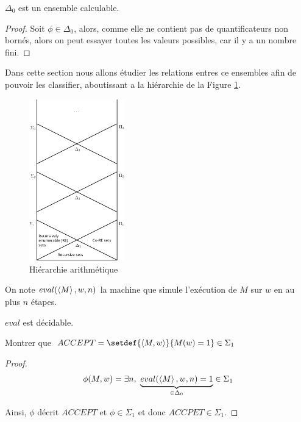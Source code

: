 \begin{prop}
	$\Delta_0$ est un ensemble calculable.
\end{prop}

\begin{proof}
	Soit $\phi \in \Delta_0$, alors, comme elle ne contient pas de quantificateurs non bornés, alors on peut essayer toutes les valeurs possibles, car il y a un nombre
	fini.
\end{proof}


Dans cette section nous allons étudier les relations entres ce ensembles afin de pouvoir les classifier, aboutissant a la hiérarchie de la Figure \ref{fig:arith-hier}.


\begin{figure}[h]
	\begin{center}
		\includegraphics[height=7cm]{./images/Arithmetic_hierarchy.png}
	\end{center}
	\caption{Hiérarchie arithmétique}
	\label{fig:arith-hier}
\end{figure}



\begin{definition}[eval]
	On note $eval(\left\langle M\right\rangle, w, n)$ la machine que simule l'exécution de $M$ sur $w$ en au plus $n$ étapes.
\end{definition}

\begin{prop}[Admis]
	$eval$ est décidable.
\end{prop}


\begin{exercice}
	Montrer que $ACCEPT = \setdef {\encode {M,w}} {M(w) = 1} \in \Sigma_1$
\end{exercice}

\begin{proof}
	$$\phi (M,w) =  \exists n, \ \underbrace{eval(\left\langle M\right\rangle, w, n) = 1}_{\in \Delta_0} \in \Sigma_1$$

	Ainsi, $\phi$ décrit $ACCEPT$ et $\phi \in \Sigma_1$ et donc $ACCPET \in \Sigma_1$.
\end{proof}


